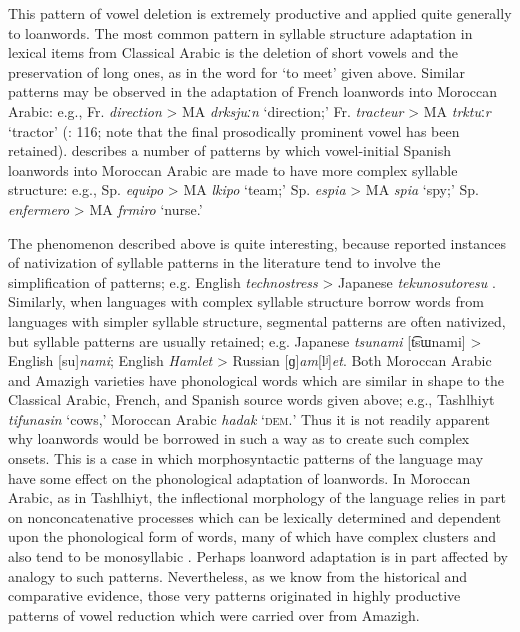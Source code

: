 This pattern of vowel deletion is extremely productive and applied quite generally to loanwords. The most common pattern in syllable structure adaptation in lexical items from Classical Arabic is the deletion of short vowels and the preservation of long ones, as in the word for ‘to meet’ given above. Similar patterns may be observed in the adaptation of French loanwords into Moroccan Arabic: e.g., Fr. \textit{direction} > MA \textit{drksjuːn} ‘direction;’ Fr. \textit{tracteur} > MA \textit{trktu}ː\textit{r} ‘tractor’ (\citealt{Chatou1997}: 116; note that the final prosodically prominent vowel has been retained). \citet{Sayahi2005} describes a number of patterns by which vowel-initial Spanish loanwords into Moroccan Arabic are made to have more complex syllable structure: e.g., Sp. \textit{equipo} > MA \textit{lkipo} ‘team;’ Sp. \textit{espia} > MA \textit{spia} ‘spy;’ Sp. \textit{enfermero} > MA \textit{frmiro} ‘nurse.’



  The phenomenon described above is quite interesting, because reported instances of nativization of syllable patterns in the literature tend to involve the simplification of patterns; e.g. English \textit{technostress} > Japanese \textit{tekunosutoresu} \citep[69]{Kay1995}. Similarly, when languages with complex syllable structure borrow words from languages with simpler syllable structure, segmental patterns are often nativized, but syllable patterns are usually retained; e.g. Japanese \textit{tsunami} [t͡sɯnami] > English [su]\textit{nami}; English \textit{Hamlet} > Russian [ɡ]\textit{am}[lʲ]\textit{et}. Both Moroccan Arabic and Amazigh varieties have phonological words which are similar in shape to the Classical Arabic, French, and Spanish source words given above; e.g., Tashlhiyt \textit{tifunasin} ‘cows,’ Moroccan Arabic \textit{hadak} ‘\textsc{dem.}’ Thus it is not readily apparent why loanwords would be borrowed in such a way as to create such complex onsets. This is a case in which morphosyntactic patterns of the language may have some effect on the phonological adaptation of loanwords. In Moroccan Arabic, as in Tashlhiyt, the inflectional morphology of the language relies in part on nonconcatenative processes which can be lexically determined and dependent upon the phonological form of words, many of which have complex clusters and also tend to be monosyllabic \citep{Heath2007}. Perhaps loanword adaptation is in part affected by analogy to such patterns. Nevertheless, as we know from the historical and comparative evidence, those very patterns originated in highly productive patterns of vowel reduction which were carried over from Amazigh.



